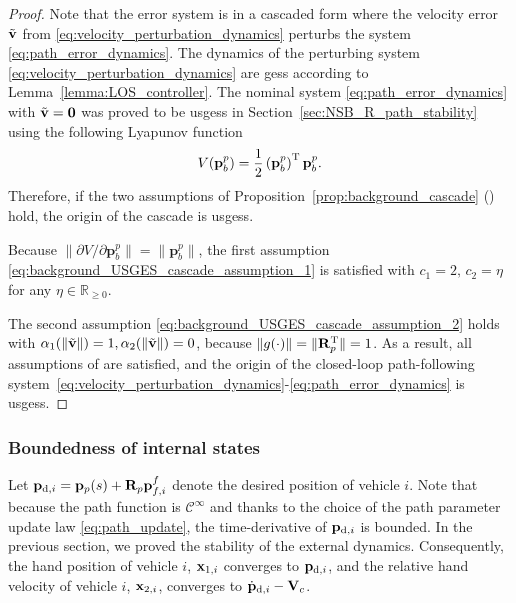 \begin{proof}
    Note that the error system is in a cascaded form where the velocity error $\Tilde{\mathbf{v}}$ from \eqref{eq:velocity_perturbation_dynamics} perturbs the system \eqref{eq:path_error_dynamics}. The dynamics of the perturbing system \eqref{eq:velocity_perturbation_dynamics} are \glspl{ges} according to Lemma~\ref{lemma:LOS_controller}. The nominal system \eqref{eq:path_error_dynamics} with $\Tilde{\mathbf{v}}=\mathbf{0}$ was proved to be \glspl{usges} in Section~\ref{sec:NSB_R_path_stability} using the following Lyapunov function
\begin{equation}
    V(\mathbf{p}_b^p) = \frac{1}{2}\left(\mathbf{p}_b^p\right)^{\mathrm{T}}\mathbf{p}_b^p.
\end{equation}
Therefore, if the two assumptions of Proposition~\ref{prop:background_cascade} (\cite[Proposition 9]{pettersen_lyapunov_2017}) hold, the origin of the cascade is \glspl{usges}.

Because $\|\partial V/\partial \mathbf{p}_b^p\| = \|\mathbf{p}_b^p\|$, the first assumption \eqref{eq:background_USGES_cascade_assumption_1} is satisfied with $c_1 = 2, \, c_2 = \eta$ for any $\eta \in \mathbb{R}_{\geq 0}$.

The second assumption \eqref{eq:background_USGES_cascade_assumption_2} holds with $\alpha_1(\|\Tilde{\mathbf{v}}\|) = 1, \alpha_2(\|\Tilde{\mathbf{v}}\|) = 0$, because $\|g(\cdot)\| = \|\mathbf{R}_p^{\mathrm{T}}\| = 1$. As a result, all assumptions of \cite[Proposition 9]{pettersen_lyapunov_2017} are satisfied, and the origin of the closed-loop path-following system~\eqref{eq:velocity_perturbation_dynamics}-\eqref{eq:path_error_dynamics} is \glspl{usges}.
\end{proof}


\subsubsection{Boundedness of internal states}
Let $\mathbf{p}_{{\rm d}, i} = \mathbf{p}_p(s) + \mathbf{R}_p\mathbf{p}_{f, i}^f$ denote the desired position of vehicle $i$. Note that because the path function is $\mathcal{C}^{\infty}$ and thanks to the choice of the path parameter update law \eqref{eq:path_update}, the time-derivative of $\mathbf{p}_{{\rm d}, i}$ is bounded.
In the previous section, we proved the stability of the external dynamics.
Consequently, the hand position of vehicle $i$, $\mathbf{x}_{1, i}$ converges to $\mathbf{p}_{{\rm d}, i}$, and the relative hand velocity of vehicle $i$, $\mathbf{x}_{2, i}$, converges to $\dot{\mathbf{p}}_{{\rm d}, i} - \mathbf{V}_c$.

